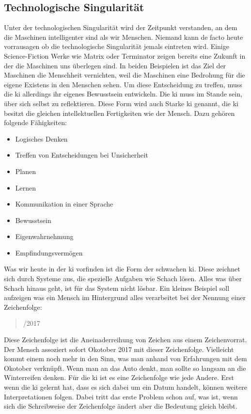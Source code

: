 \subsection{Technologische Singularität}
Unter der technologischen Singularität wird der Zeitpunkt verstanden, an dem die Maschinen intelligenter sind als wir Menschen. Niemand kann de facto heute vorrausagen ob die technologische Singularität jemals eintreten wird. Einige Science-Fiction Werke wie Matrix oder Terminator zeigen bereits eine Zukunft in der die Maschinen uns überlegen sind. In beiden Beispielen ist das Ziel der Maschinen die Menschheit vernichten, weil die Maschinen eine Bedrohung für die eigene Existens in den Menschen sehen. Um diese Entscheidung zu treffen, muss die \ac{ki} allerdings ihr eigenes Bewusstsein entwickeln. Die \ac{ki} muss im Stande sein, über sich selbst zu reflektieren. Diese Form wird auch Starke \ac{ki} genannt, die \ac{ki} besitzt die gleichen intellektuellen Fertigkeiten wie der Mensch. Dazu gehören folgende Fähigkeiten:
\begin{itemize}
	\item Logisches Denken
	\item Treffen von Entscheidungen bei Unsicherheit
	\item Planen      
	\item Lernen
	\item Kommunikation in einer Sprache
	\item Bewusstsein
	\item Eigenwahrnehmung
	\item Empfindungsvermögen
\end{itemize}
Was wir heute in der \ac{ki} vorfinden ist die Form der schwachen \ac{ki}. Diese zeichnet sich durch Systeme aus, die spezielle Aufgaben wie Schach lösen. Alles was über Schach hinaus geht, ist für das System nicht lösbar. \linebreak
Ein kleines Beispiel soll aufzeigen was ein Mensch im Hintergrund alles verarbeitet bei der Nennung einer Zeichenfolge:
\begin{quote}
	/2017 
\end{quote}
Diese Zeichenfolge ist die Aneinaderreihung von Zeichen aus einem Zeichenvorrat. Der Mensch assoziert sofort Okotober 2017 mit dieser Zeichenfolge. Vielleicht kommt einem noch mehr in den Sinn, was man anhand von Erfahrungen mit dem Okotober verknüpft. Wenn man an das Auto denkt, man sollte so langsam an die Winterreifen denken. Für die \ac{ki} ist es eine Zeichenfolge wie jede Andere. Erst wenn die \ac{ki} gelernt hat, dass es sich dabei um ein Datum handelt, können weitere Interpretationen folgen. Dabei tritt das erste Problem schon auf, was ist, wenn sich die Schreibweise der Zeichenfolge ändert aber die Bedeutung gleich bleibt.
